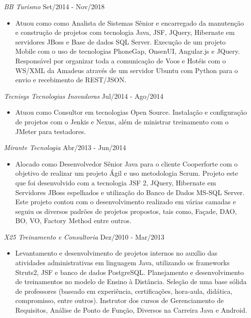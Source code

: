 \documentclass{res}
\begin{document}
\begin{resume}
		{\sl BB Turismo} \hfill Set/2014 - Nov/2018
		\begin{itemize}
			\item Atuou como como Analista de Sistemas Sênior e encarregado da manutenção e construção de projetos com tecnologia Java, JSF, JQuery, Hibernate em servidores JBoss e Base de dados SQL Server. Execução de um projeto Mobile com o uso de tecnologias PhoneGap, OnsenUI, Angular.js e JQuery. Responsável por organizar toda a comunicação de Voos e Hotéis com o WS/XML da Amadeus através de um servidor Ubuntu com Python para o envio e recebimento de REST/JSON.
		\end{itemize}
		
		{\sl Tecnisys Tecnologias Inovadoras} \hfill Jul/2014 - Ago/2014
		\begin{itemize}
			\item Atuou como Consultor em tecnologias Open Source. Instalação e configuração de projetos com o Jenkis e Nexus, além de ministrar treinamento com o JMeter para testadores.
		\end{itemize}
		
		{\sl Mirante Tecnologia} \hfill Abr/2013 - Jun/2014
		\begin{itemize}
			\item Alocado como Desenvolvedor Sênior Java para o cliente Cooperforte com o objetivo de realizar um projeto Ágil e uso metodologia Scrum. Projeto este que foi desenvolvido com a tecnologia JSF 2, JQuery, Hibernate em Servidores JBoss espelhados e utilização do Banco de Dados MS-SQL Server. Este projeto contou com o desenvolvimento realizado em várias camadas e seguiu os diversos padrões de projetos propostos, tais como, Façade, DAO, BO, VO, Factory Method entre outros. 
		\end{itemize}
		
		{\sl X25 Treinamento e Consultoria} \hfill   Dez/2010 - Mar/2013
		\begin{itemize}
			\item Levantamento e desenvolvimento de projetos internos no auxílio das atividades administrativas em linguagem Java, utilizando os frameworks Struts2, JSF e banco de dados PostgreSQL. Planejamento e desenvolvimento de treinamentos no modelo de Ensino à Distância. Seleção de uma base sólida de professores (baseado em experiência, certificações, hora-aula, didática, compromisso, entre outros). Instrutor dos cursos de Gerenciamento de Requisitos, Análise de Ponto de Função, Diversos na Carreira Java e Android. 
		\end{itemize}
		

\end{resume}
\end{document}
